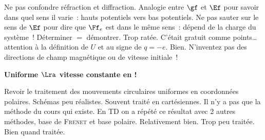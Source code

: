 \documentclass[a4paper, 12pt, final, garamond]{book}
\begin{document}
\begin{enumerate}
	Ne pas confondre réfraction et diffraction.
	Analogie entre $\gf$ et $\Ef$ pour savoir dans quel sens il varie~: hauts
	potentiels vers bas potentiels. Ne pas sauter sur le sens de $\Ef$ pour dire
	que $\Ff_e$ est dans le même sens~: dépend de la charge du système~!
	Déterminer $=$ démontrer.
	Trop ratée. C'était gratuit comme points… attention à la définition de $U$ et
	au signe de $q = -e$.
	Bien.
	N'inventez pas des directions de champ magnétique ou de vitesse initiale~!
	\begin{center}
		\textbf{Uniforme $\Lra$ vitesse constante en  !}
	\end{center}
	Revoir le traitement des mouvements circulaires uniformes en coordonnées
	polaires. Schémas peu réalistes.
	Souvent traité en cartésiennes. Il n'y a pas que la méthode du cours qui
	existe. En TD on a répété ce résultat avec 2 autres méthodes, base de
	\textsc{Frenet} et base polaire.
	Relativement bien.
	Trop peu traitée.
	Bien quand traitée.
\end{enumerate}
\end{document}
